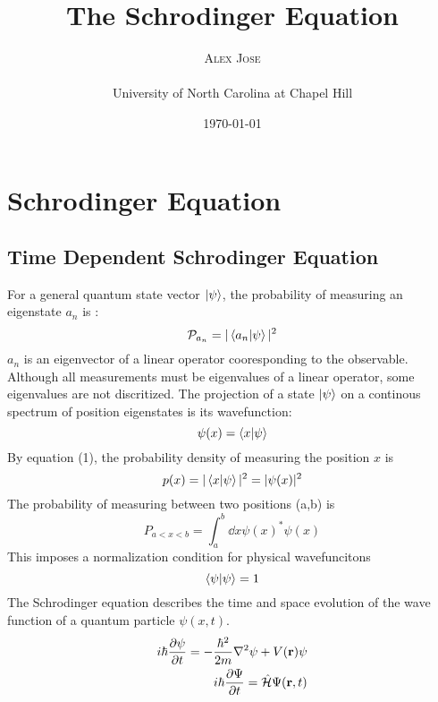 \documentclass[twoside,twocolumn]{article}
\title{The Schrodinger Equation} %
\author{%
\textsc{Alex Jose}\\[1ex] %
\textsc{}\\[1ex] %
\small{University of North Carolina at Chapel Hill}	%
}
\date{\today} %
\begin{document}
\maketitle




\section{Schrodinger Equation} \label{sec:theory}
\subsection{Time Dependent Schrodinger Equation}
For a general quantum state vector $\ket{\psi}$, the probability of measuring an eigenstate $a_n$ is \cite{q2}:
\begin{equation}
	\mathcal{P}_{a_n} = |\bra{a_n}\ket{\psi}|^2
\end{equation}
$a_n$ is an eigenvector of  a  linear operator cooresponding to the observable. Although all measurements must be eigenvalues of a linear operator, some eigenvalues are not discritized. 
The projection of a state $\ket{\psi}$ on a continous spectrum of position eigenstates is its wavefunction:
\begin{equation}
	\psi(x) = \bra{x}\ket{\psi}
\end{equation}
By equation (1), the probability density of measuring the position $x$ is
\begin{equation}
	p(x) = |\bra{x}\ket{\psi}|^2 = |\psi(x)|^2
\end{equation}
The probability of measuring between two positions (a,b) is
\begin{equation}
	P_{a<x<b} = \int_{a}^{b} \dd{x} \psi(x)^* \psi(x)
\end{equation}
This imposes a normalization condition for physical wavefuncitons
\begin{equation}
	\braket{\psi} = 1
\end{equation}
The Schrodinger equation describes the time and space evolution of the wave function of a quantum particle $\psi(x,t)$. 
\begin{equation}
	\begin{split}
	i\hbar \pdv{\psi}{t} = - \frac{\hbar ^2}{2m} \laplacian{\psi} + V(\vb{r}) \psi\\
	i\hbar \pdv{\Psi}{t} = \hat{\mathcal{H}}\Psi(\vb{r},t)
\end{split}
\end{equation}
\end{document}
